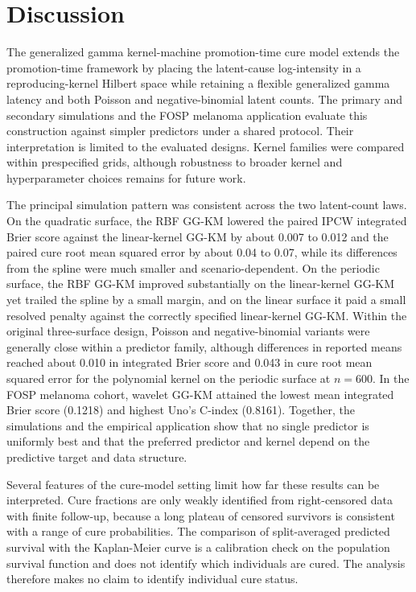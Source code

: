 \section{Discussion}\label{sec:discussion}

The generalized gamma kernel-machine promotion-time cure model extends the promotion-time
framework by placing the latent-cause log-intensity in a reproducing-kernel Hilbert space
while retaining a flexible generalized gamma latency and both Poisson and negative-binomial
latent counts. The primary and secondary simulations and the
FOSP melanoma application evaluate this construction against simpler predictors under a shared protocol.
Their interpretation is limited to the evaluated designs. Kernel families were compared
within prespecified grids, although robustness to broader kernel and hyperparameter choices
remains for future work.

The principal simulation pattern was consistent across the two latent-count laws. On the
quadratic surface, the RBF GG-KM lowered the paired IPCW integrated Brier score against the
linear-kernel GG-KM by about 0.007 to 0.012 and the paired cure root mean squared error by
about 0.04 to 0.07, while its differences from the spline were much smaller and
scenario-dependent. On the periodic surface, the RBF GG-KM improved substantially on the
linear-kernel GG-KM yet trailed the spline by a small margin, and on the linear surface it
paid a small resolved penalty against the correctly specified linear-kernel GG-KM. Within
the original three-surface design, Poisson and negative-binomial variants were generally
close within a predictor family, although differences in reported means reached about
0.010 in integrated Brier score and 0.043 in cure root mean squared error for the
polynomial kernel on the periodic surface at $n=600$.
In the FOSP melanoma cohort, wavelet GG-KM attained the lowest mean integrated
Brier score (0.1218) and highest Uno's C-index (0.8161). Together,
the simulations and the empirical application show that no
single predictor is uniformly best and that the preferred predictor and
kernel depend on the predictive target and data structure.

Several features of the cure-model setting limit how far these results can be interpreted. Cure fractions are
only weakly identified from right-censored data with finite follow-up, because a long plateau of censored
survivors is consistent with a range of cure probabilities. The comparison of split-averaged predicted survival with the Kaplan-Meier curve is a
calibration check on the population survival function and does not identify which individuals are cured. The
analysis therefore makes no claim to identify individual cure status.

